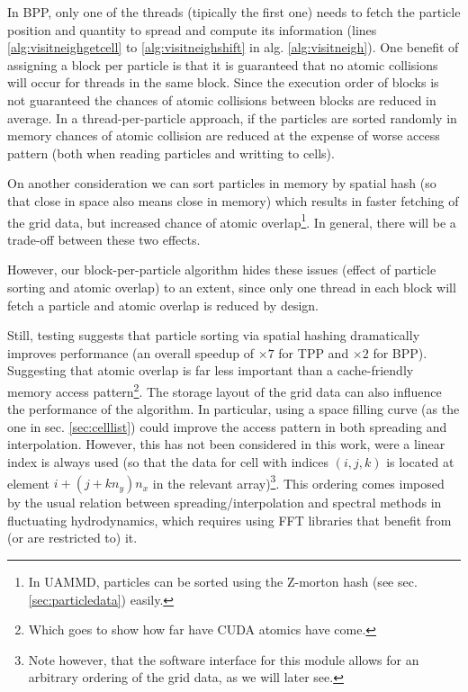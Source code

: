 \documentclass[ twoside,openright,titlepage,numbers=noenddot,%
headinclude,footinclude,cleardoublepage=empty,abstract=on,
BCOR=5mm,paper=a4,fontsize=11pt, dvipsnames
]{scrreprt}
\newcommand{\uammd}{\gls{UAMMD}\xspace}
\begin{document}
In BPP, only one of the threads (tipically the first one) needs to fetch the particle position and quantity to spread and compute its information (lines \ref{alg:visitneighgetcell} to \ref{alg:visitneighshift} in alg. \ref{alg:visitneigh}).
One benefit of assigning a block per particle is that it is guaranteed that no atomic collisions will occur for threads in the same block. Since the execution order of blocks is not guaranteed the chances of atomic collisions between blocks are reduced in average.
In a thread-per-particle approach, if the particles are sorted randomly in memory chances of atomic collision are reduced at the expense of worse access pattern (both when reading particles and writting to cells).

On another consideration we can sort particles in memory by spatial hash (so that close in space also means close in memory) which results in faster fetching of the grid data, but increased chance of atomic overlap\footnote{In \uammd, particles can be sorted using the Z-morton hash (see sec. \ref{sec:particledata}) easily.}. In general, there will be a trade-off between these two effects.

However, our block-per-particle algorithm hides these issues (effect of particle sorting and atomic overlap) to an extent, since only one thread in each block will fetch a particle and atomic overlap is reduced by design.

Still, testing suggests that particle sorting via spatial hashing dramatically improves performance (an overall speedup of $\times 7$ for TPP and $\times 2$ for BPP). Suggesting that atomic overlap is far less important than a cache-friendly memory access pattern\footnote{Which goes to show how far have CUDA atomics have come.}.
The storage layout of the grid data can also influence the performance of the algorithm. In particular, using a space filling curve (as the one in sec. \ref{sec:celllist}) could improve the access pattern in both spreading and interpolation\cite{Shih2021}. However, this has not been considered in this work, were a linear index is always used (so that the data for cell with indices $(i,j,k)$ is located at element $i+(j+kn_y)n_x$ in the relevant array)\footnote{Note however, that the software interface for this module allows for an arbitrary ordering of the grid data, as we will later see.}. This ordering comes imposed by the usual relation between spreading/interpolation and spectral methods in fluctuating hydrodynamics, which requires using \gls{FFT} libraries that benefit from (or are restricted to) it.
\end{document}
